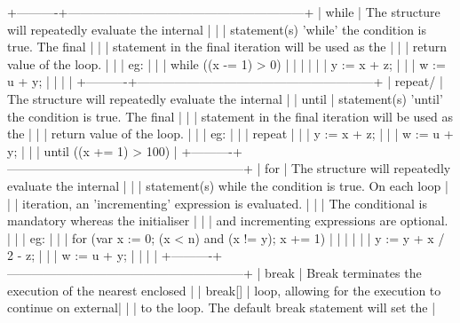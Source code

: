 +----------+---------------------------------------------------------+
| while    | The structure will repeatedly evaluate the internal     |
|          | statement(s) 'while' the condition is true. The final   |
|          | statement in the final iteration will be used as the    |
|          | return value of the loop.                               |
|          | eg:                                                     |
|          | while ((x -= 1) > 0)                                    |
|          | {                                                       |
|          |   y := x + z;                                           |
|          |   w := u + y;                                           |
|          | }                                                       |
+----------+---------------------------------------------------------+
| repeat/  | The structure will repeatedly evaluate the internal     |
| until    | statement(s) 'until' the condition is true. The final   |
|          | statement in the final iteration will be used as the    |
|          | return value of the loop.                               |
|          | eg:                                                     |
|          | repeat                                                  |
|          |   y := x + z;                                           |
|          |   w := u + y;                                           |
|          | until ((x += 1) > 100)                                  |
+----------+---------------------------------------------------------+
| for      | The structure will repeatedly evaluate the internal     |
|          | statement(s) while the condition is true. On each loop  |
|          | iteration, an 'incrementing' expression is evaluated.   |
|          | The conditional is mandatory whereas the initialiser    |
|          | and incrementing expressions are optional.              |
|          | eg:                                                     |
|          | for (var x := 0; (x < n) and (x != y); x += 1)          |
|          | {                                                       |
|          |   y := y + x / 2 - z;                                   |
|          |   w := u + y;                                           |
|          | }                                                       |
+----------+---------------------------------------------------------+
| break    | Break terminates the execution of the nearest enclosed  |
| break[]  | loop, allowing for the execution to continue on external|
|          | to the loop. The default break statement will set the   |
